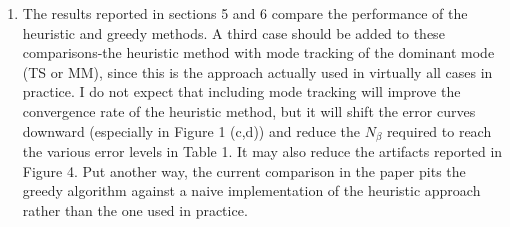 \documentclass{article}
\newcommand{\response}[1]{\textcolor{red}{#1}}
\begin{document}
\begin{enumerate}
    \response{The recursion parameters need not be eigenvalues of $M(x)$ for the greedy algorithm to work. However, we use these eigenvalues to define the objective function, and so we would need to define a different objective function to implemented the greedy algorithm without computing the eigenvalues of $M$. We have updated Section 3 so that we cast the optimization problem as a \textit{subset selection} problem, where we seek a subset of the convergent recursion parameters (which are a subset of the eigenvalues of $M$) that minimizes the OWNS approximation error for a given $N_\beta$. Future work could explore how to pose this problem with incomplete knowledge of the eigenvalues of $M$ and/or in terms of an optimization for recursion parameters that are not eigenvalues of $M$.}

    \item The results reported in sections 5 and 6 compare the performance of the heuristic and greedy methods. A third case should be added to these comparisons-the heuristic method with mode tracking of the dominant mode (TS or MM), since this is the approach actually used in virtually all cases in practice. I do not expect that including mode tracking will improve the convergence rate of the heuristic method, but it will shift the error curves downward (especially in Figure 1 (c,d)) and reduce the $N_\beta$ required to reach the various error levels in Table 1. It may also reduce the artifacts reported in Figure 4. Put another way, the current comparison in the paper pits the greedy algorithm against a naive implementation of the heuristic approach rather than the one used in practice.


\end{enumerate}
\end{document}
